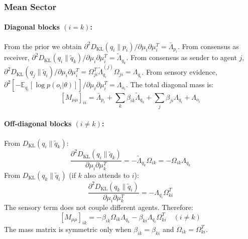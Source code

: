 \documentclass[11pt]{article}
\begin{document}
\subsubsection{Mean Sector}

\paragraph{Diagonal blocks $(i = k)$:} From the prior we obtain $\partial^2 D_{\mathrm{KL}}(q_i \| p_i)/\partial \mu_i \partial \mu_i^T = \bar{\Lambda}_{p_i}$. From consensus as receiver, $\partial^2 D_{\mathrm{KL}}(q_i \| \tilde{q}_k)/\partial \mu_i \partial \mu_i^T = \tilde{\Lambda}_{q_k}$. From consensus as sender to agent $j$, $\partial^2 D_{\mathrm{KL}}(q_j \| \tilde{q}_i)/\partial \mu_i \partial \mu_i^T = \Omega_{ji}^T \tilde{\Lambda}_{q_i}^{(j)} \Omega_{ji} = \Lambda_{q_i}$. From sensory evidence, $\partial^2[-\mathbb{E}_{q_i}[\log p(o_i | \theta)]]/\partial \mu_i \partial \mu_i^T = \Lambda_{o_i}$. The total diagonal mass is:
\begin{equation}
\boxed{[M_{\mu\mu}]_{ii} = \bar{\Lambda}_{p_i} + \sum_k \beta_{ik} \tilde{\Lambda}_{q_k} + \sum_j \beta_{ji} \Lambda_{q_i} + \Lambda_{o_i}}
\label{eq:mass_mu_diagonal}
\end{equation}

\paragraph{Off-diagonal blocks $(i \neq k)$:} From $D_{\mathrm{KL}}(q_i \| \tilde{q}_k)$:
\begin{equation}
\frac{\partial^2 D_{\mathrm{KL}}(q_i \| \tilde{q}_k)}{\partial \mu_i \partial \mu_k^T} = -\tilde{\Lambda}_{q_k}\Omega_{ik} = -\Omega_{ik}\Lambda_{q_k}
\end{equation}
From $D_{\mathrm{KL}}(q_k \| \tilde{q}_i)$ (if $k$ also attends to $i$):
\begin{equation}
\frac{\partial^2 D_{\mathrm{KL}}(q_k \| \tilde{q}_i)}{\partial \mu_i \partial \mu_k^T} = -\Lambda_{q_i}\Omega_{ki}^T
\end{equation}
The sensory term does not couple different agents. Therefore:
\begin{equation}
\boxed{[M_{\mu\mu}]_{ik} = -\beta_{ik}\Omega_{ik}\Lambda_{q_k} - \beta_{ki}\Lambda_{q_i}\Omega_{ki}^T \quad (i \neq k)}
\label{eq:mass_mu_offdiagonal}
\end{equation}
The mass matrix is symmetric only when $\beta_{ik} = \beta_{ki}$ and $\Omega_{ik} = \Omega_{ki}^T$.
\end{document}
